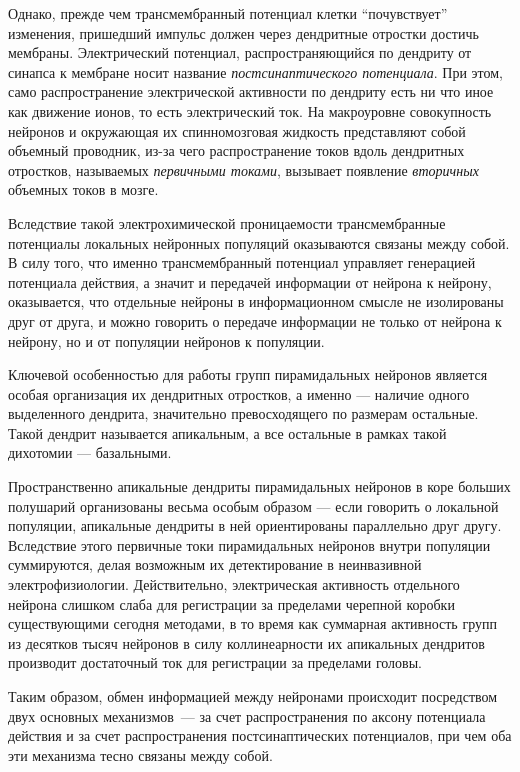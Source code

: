 Однако, прежде чем трансмембранный потенциал клетки ``почувствует'' изменения,
пришедший импульс должен через дендритные отростки достичь мембраны.
Электрический потенциал, распространяющийся по дендриту от синапса к мембране
носит название \emph{постсинаптического потенциала}. При этом, само
распространение электрической активности по дендриту есть ни что иное как
движение ионов, то есть электрический ток. На макроуровне совокупность нейронов
и окружающая их спинномозговая жидкость представляют собой объемный проводник,
из-за чего распространение токов вдоль дендритных отростков, называемых
\emph{первичными токами}, вызывает появление \emph{вторичных} объемных токов в
мозге.

Вследствие такой электрохимической проницаемости трансмембранные потенциалы
локальных нейронных популяций оказываются связаны между собой. В силу того, что
именно трансмембранный потенциал управляет генерацией потенциала действия, а
значит и передачей информации от нейрона к нейрону, оказывается, что отдельные
нейроны в информационном смысле не изолированы друг от друга, и можно говорить
о передаче информации не только от нейрона к нейрону, но и от популяции
нейронов к популяции.

Ключевой особенностью для работы групп пирамидальных нейронов является особая
организация их дендритных отростков, а именно --- наличие одного выделенного
дендрита, значительно превосходящего по размерам остальные. Такой дендрит
называется апикальным, а все остальные в рамках такой дихотомии --- базальными.

Пространственно апикальные дендриты пирамидальных нейронов в коре больших
полушарий организованы весьма особым образом --- если говорить о локальной
популяции, апикальные дендриты в ней ориентированы параллельно друг другу.
Вследствие этого первичные токи пирамидальных нейронов внутри популяции
суммируются, делая возможным их детектирование в неинвазивной
электрофизиологии. Действительно, электрическая активность отдельного нейрона
слишком слаба для регистрации за пределами черепной коробки существующими
сегодня методами, в то время как  суммарная активность групп из десятков тысяч
нейронов в силу коллинеарности их апикальных дендритов производит достаточный
ток для регистрации за пределами головы.



Таким образом, обмен информацией между нейронами происходит посредством двух
основных механизмов~--- за счет распространения по аксону потенциала действия и
за счет распространения постсинаптических потенциалов, при чем оба эти
механизма тесно связаны между собой.


